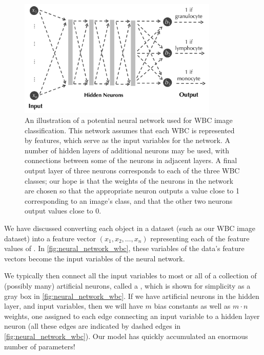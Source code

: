 \begin{figure}[h]
\centering
\mySfFamily
\includegraphics[width = 0.85\textwidth]{../images/neural_network_wbc.png}
\caption{An illustration of a potential neural network used for WBC image classification. This network assumes that each WBC is represented by  features, which serve as the input variables for the network. A number of hidden layers of additional neurons may be used, with connections between some of the neurons in adjacent layers. A final output layer of three neurons corresponds to each of the three WBC classes; our hope is that the weights of the neurons in the network are chosen so that the appropriate neuron outputs a value close to 1 corresponding to an image's class, and that the other two neurons output values close to 0.}
\label{fig:neural_network_wbc}
\end{figure}

We have discussed converting each object  in a dataset (such as our WBC image dataset) into a feature vector $(x_1, x_2, \ldots, x_n)$ representing each of the  feature values of . In \autoref{fig:neural_network_wbc}, these  variables of the data's feature vectors become the  input variables of the neural network.

We typically then connect all the input variables to most or all of a collection of (possibly many) artificial neurons, called a , which is shown for simplicity as a gray box in \autoref{fig:neural_network_wbc}. If we have  artificial neurons in the hidden layer, and  input variables, then we will have $m$ bias constants as well as $m \cdot n$ weights, one assigned to each edge connecting an input variable to a hidden layer neuron (all these edges are indicated by dashed edges in \autoref{fig:neural_network_wbc}). Our model has quickly accumulated an enormous number of parameters!

